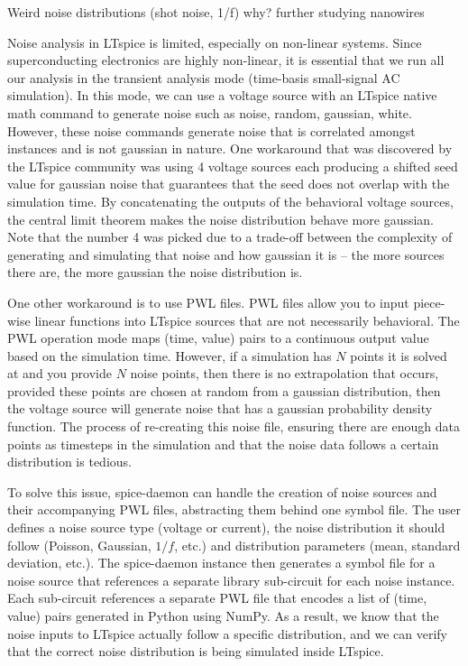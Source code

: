 \documentclass{article}
\newcommand{\cf}[1]{\textsf{#1}}
\begin{document}
Weird noise distributions (shot noise, 1/f) why? further studying nanowires


Noise analysis in LTspice is limited, especially on non-linear systems. Since superconducting electronics
are highly non-linear, it is essential that we run all our analysis in the transient analysis mode (time-basis 
small-signal AC simulation). In this mode, we can use a voltage source with an LTspice native math command
to generate noise such as \cf{noise}, \cf{random}, \cf{gaussian}, \cf{white}. However, these noise commands
generate noise that is correlated amongst instances and is not gaussian in nature. One workaround that was
discovered by the LTspice community was using 4 voltage sources each producing a shifted seed value for 
gaussian noise that guarantees that the seed does not overlap with the simulation time. By concatenating the
outputs of the behavioral voltage sources, the central limit theorem makes the noise distribution behave more 
gaussian. Note that the number 4 was picked due to a trade-off between the complexity of generating and simulating
that noise and how gaussian it is -- the more sources there are, the more gaussian the noise distribution is.

One other workaround is to use PWL files. PWL files allow you to input piece-wise linear functions into LTspice
sources that are not necessarily behavioral. The PWL operation mode maps (time, value) pairs to a continuous 
output value based on the simulation time. However, if a simulation has $N$ points it is solved at and you 
provide $N$ noise points, then there is no extrapolation that occurs, provided these points are chosen at random 
from a gaussian distribution, then the voltage source will generate noise that has a gaussian probability density
function. The process of re-creating this noise file, ensuring there are enough data points as timesteps in the 
simulation and that the noise data follows a certain distribution is tedious.

To solve this issue, spice-daemon can handle the creation of noise sources and their accompanying PWL files,
abstracting them behind one symbol file. The user defines a noise source type (voltage or current), the 
noise distribution it should follow (Poisson, Gaussian, $1/f$, etc.) and distribution parameters (mean, 
standard deviation, etc.). The spice-daemon instance then generates a symbol file for a noise source that 
references a separate library sub-circuit for each noise instance. Each sub-circuit references a 
separate PWL file that encodes a list of (time, value) pairs generated in Python using
\cf{NumPy}. As a result, we know that the noise inputs to LTspice actually follow a specific distribution, and we
can verify that the correct noise distribution is being simulated inside LTspice.
\end{document}
